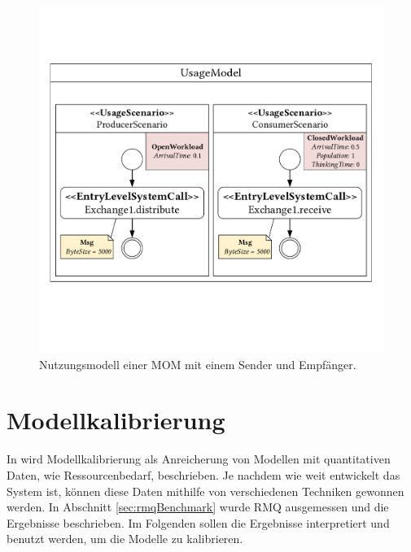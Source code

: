\begin{figure}
\center
  \includegraphics[width=1\textwidth]{images/modelling/modelingUsage.pdf}
  \caption{Nutzungsmodell einer MOM mit einem Sender und Empfänger.}
  \label{img:mom_usage}
\end{figure}

\section{Modellkalibrierung}
\label{sec:rmqRd}
In \cite{palladio17} wird Modellkalibrierung als Anreicherung von Modellen mit quantitativen Daten, wie Ressourcenbedarf, beschrieben. Je nachdem wie weit entwickelt das System ist, können diese Daten mithilfe von verschiedenen Techniken gewonnen werden. In Abschnitt \ref{sec:rmqBenchmark} wurde RMQ ausgemessen und die Ergebnisse beschrieben. Im Folgenden sollen die Ergebnisse interpretiert und benutzt werden, um die Modelle zu kalibrieren.

